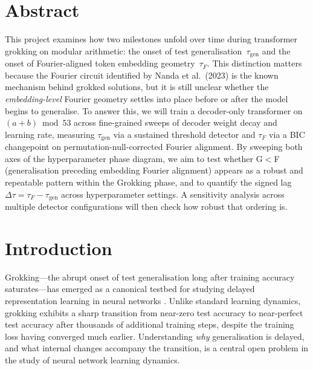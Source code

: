 \documentclass[12pt,openany,a4paper]{book}
\newcommand{\taug}{\tau_{\mathrm{gen}}}
\newcommand{\tauf}{\tau_{F}}
\newcommand{\Dtau}{\Delta\tau}
\begin{document}
\chapter{Abstract}

This project examines how two milestones unfold over time during transformer grokking on modular arithmetic:
the onset of test generalisation~$\taug$ and the onset of
Fourier-aligned token embedding geometry~$\tauf$.
This distinction matters because the Fourier circuit identified by Nanda et al.\ (2023) is the known mechanism behind grokked solutions, but it is still unclear whether the \emph{embedding-level} Fourier geometry settles into place before or after the model begins to generalise.
To answer this, we will train a decoder-only transformer on $(a+b)\bmod 53$ across fine-grained sweeps of decoder weight decay and learning rate,
measuring $\taug$ via a sustained threshold detector and $\tauf$ via a
BIC changepoint on permutation-null-corrected Fourier alignment.
By sweeping both axes of the hyperparameter phase diagram, we aim to test whether G$<$F (generalisation preceding embedding Fourier alignment) appears as a robust and repeatable pattern within the Grokking phase, and to quantify the signed lag $\Dtau = \tauf - \taug$ across hyperparameter settings.
A sensitivity analysis across multiple detector configurations will then check how robust that ordering is.

\tableofcontents

\listoffigures
{}

\listoftables
{}

\cleardoublepage
\mainmatter

\chapter{Introduction}

Grokking---the abrupt onset of test generalisation long after training
accuracy saturates---has emerged as a canonical testbed for studying
delayed representation learning in neural networks
\cite{power2022grokking}.
Unlike standard learning dynamics, grokking exhibits a sharp transition
from near-zero test accuracy to near-perfect test accuracy after
thousands of additional training steps, despite the training loss
having converged much earlier.
Understanding \emph{why} generalisation is delayed, and what internal
changes accompany the transition, is a central open problem in the
study of neural network learning dynamics.
\end{document}
